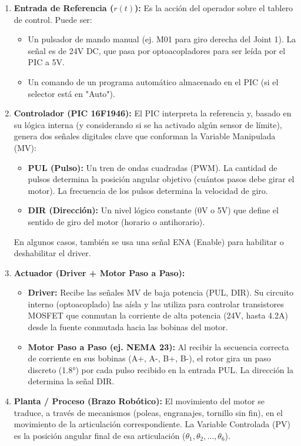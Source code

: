 \documentclass[11pt]{article}
\begin{document}
\begin{enumerate}
	\item \textbf{Entrada de Referencia ($r(t)$):} Es la acción del operador sobre el tablero de control. Puede ser:
	\begin{itemize}
		\item Un pulsador de mando manual (ej. M01 para giro derecha del Joint 1). La señal es de 24V DC, que pasa por optoacopladores para ser leída por el PIC a 5V.
		\item Un comando de un programa automático almacenado en el PIC (si el selector está en "Auto").
	\end{itemize}
	
	\item \textbf{Controlador (PIC 16F1946):} El PIC interpreta la referencia y, basado en su lógica interna (y considerando si se ha activado algún sensor de límite), genera dos señales digitales clave que conforman la Variable Manipulada (MV):
	\begin{itemize}
		\item \textbf{PUL (Pulso):} Un tren de ondas cuadradas (PWM). La cantidad de pulsos determina la posición angular objetivo (cuántos pasos debe girar el motor). La frecuencia de los pulsos determina la velocidad de giro.
		\item \textbf{DIR (Dirección):} Un nivel lógico constante (0V o 5V) que define el sentido de giro del motor (horario o antihorario).
	\end{itemize}
	En algunos casos, también se usa una señal ENA (Enable) para habilitar o deshabilitar el driver.
	
	\item \textbf{Actuador (Driver + Motor Paso a Paso):}
	\begin{itemize}
		\item \textbf{Driver:} Recibe las señales MV de baja potencia (PUL, DIR). Su circuito interno (optoacoplado) las aísla y las utiliza para controlar transistores MOSFET que conmutan la corriente de alta potencia (24V, hasta 4.2A) desde la fuente conmutada hacia las bobinas del motor.
		\item \textbf{Motor Paso a Paso (ej. NEMA 23):} Al recibir la secuencia correcta de corriente en sus bobinas (A+, A-, B+, B-), el rotor gira un paso discreto (1.8°) por cada pulso recibido en la entrada PUL. La dirección la determina la señal DIR.
	\end{itemize}
	
	\item \textbf{Planta / Proceso (Brazo Robótico):} El movimiento del motor se traduce, a través de mecanismos (poleas, engranajes, tornillo sin fin), en el movimiento de la articulación correspondiente. La Variable Controlada (PV) es la posición angular final de esa articulación ($\theta_1, \theta_2, \ldots, \theta_6$).
	

\end{enumerate}
\end{document}
